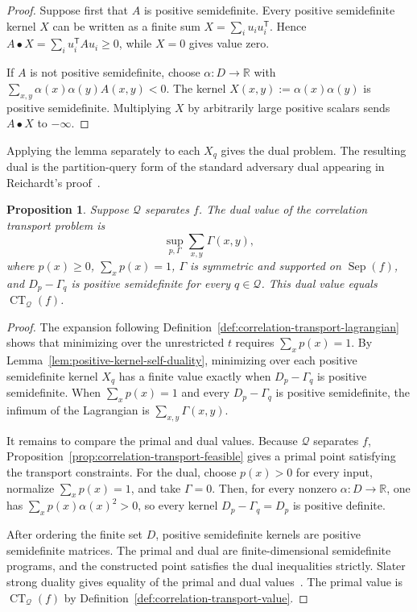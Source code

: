 \documentclass[11pt]{article}
\numberwithin{equation}{section}
\newtheorem{proposition}[definition]{Proposition}
\theoremstyle{remark}
\begin{document}
\begin{proof}
Suppose first that $A$ is positive semidefinite. Every positive semidefinite kernel $X$ can be written
as a finite sum $X=\sum_i u_i u_i^{\mathsf T}$. Hence
$A\mathbin{\bullet}X=\sum_i u_i^{\mathsf T}Au_i\geq0$, while $X=0$ gives
value zero.

If $A$ is not positive semidefinite, choose $\alpha:D\to\mathbb R$ with
$\sum_{x,y}\alpha(x)\alpha(y)A(x,y)<0$. The kernel
$X(x,y):=\alpha(x)\alpha(y)$ is positive semidefinite. Multiplying $X$ by arbitrarily
large positive scalars sends $A\mathbin{\bullet}X$ to $-\infty$.
\end{proof}

Applying the lemma separately to each $X_q$ gives the dual problem. The resulting dual is the partition-query form of the standard adversary dual appearing in Reichardt's proof~\cite{Reichardt2009}.

\begin{proposition}
\label{prop:correlation-transport-dual}
Suppose $\mathcal Q$ separates $f$. The dual value of the correlation
transport problem is
\begin{equation}
    \sup_{p,\Gamma}
        \sum_{x,y}\Gamma(x,y),
\end{equation}
where $p(x)\geq0$, $\sum_xp(x)=1$, $\Gamma$ is symmetric and supported on
$\operatorname{Sep}(f)$, and $D_p-\Gamma_q$ is positive semidefinite for every
$q\in\mathcal Q$. This dual value equals
$\operatorname{CT}_{\mathcal Q}(f)$.
\end{proposition}

\begin{proof}
The expansion following Definition~\ref{def:correlation-transport-lagrangian} shows that minimizing over the unrestricted
$t$ requires $\sum_xp(x)=1$. By
Lemma~\ref{lem:positive-kernel-self-duality}, minimizing over each positive semidefinite
kernel $X_q$ has a finite value exactly when $D_p-\Gamma_q$ is positive semidefinite.
When $\sum_xp(x)=1$ and every $D_p-\Gamma_q$ is positive semidefinite, the infimum of the Lagrangian is $\sum_{x,y}\Gamma(x,y)$.

It remains to compare the primal and dual values. Because $\mathcal Q$ separates $f$, Proposition~\ref{prop:correlation-transport-feasible} gives a primal point satisfying the transport constraints. For the dual, choose $p(x)>0$ for every input, normalize $\sum_xp(x)=1$, and take $\Gamma=0$. Then, for every nonzero $\alpha:D\to\mathbb R$, one has $\sum_xp(x)\alpha(x)^2>0$, so every kernel $D_p-\Gamma_q=D_p$ is positive definite.

After ordering the finite set $D$, positive semidefinite kernels are positive semidefinite matrices. The primal and dual are finite-dimensional semidefinite programs, and the constructed point satisfies the dual inequalities strictly. Slater strong duality gives equality of the primal and dual values~\cite[Theorem~3.4]{Lovasz2003}. The primal value is $\operatorname{CT}_{\mathcal Q}(f)$ by Definition~\ref{def:correlation-transport-value}.
\end{proof}
\end{document}

